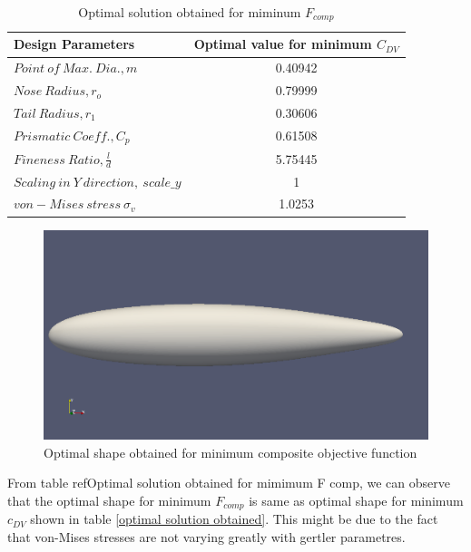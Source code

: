 \begin{table}[H]
	\centering
	\caption{Optimal solution obtained for miminum $ F_{comp} $}
	\label{Optimal solution obtained for mimimum F comp}
	\begin{tabular}{lc}
		\hline \hline
		Design Parameters & Optimal value for minimum $ C_{DV} $    \\ \hline \hline
		
		$ Point\ of\ Max.\ Dia., m$ & 0.40942      \\  
		$ Nose\ Radius, r _{o} $ & 0.79999    \\
		$ Tail\ Radius, r _{1} $ & 0.30606    \\  
		$ Prismatic\ Coeff., C _{p }$ & 0.61508 \\
		$ Fineness\ Ratio, \frac{l}{d} $ & 5.75445 \\
		$Scaling\ in\ Y\ direction,\ scale\_y$ &1 \\ \hline \hline
		
		$ von-Mises\ stress\  \sigma _{v}  $ & 1.0253 \\
		\hline \hline
	\end{tabular}
\end{table}

\begin{figure}[H]
	\centering
	\includegraphics[width=300 pt]{rnd/min_f_comp.png}
	\caption{Optimal shape obtained for minimum composite objective function}
	\label{Optimal F comp} %
\end{figure}
From table ref{Optimal solution obtained for mimimum F comp}, we can observe that the optimal shape for minimum $ F_{comp} $ is same as optimal shape for minimum $ c_{DV} $ shown in table \ref{optimal solution obtained}. This might be due to the fact that von-Mises stresses are not varying greatly with gertler parametres.